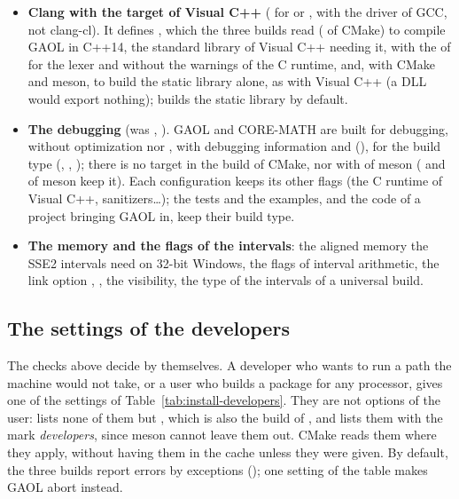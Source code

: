 \begin{itemize}
  target), which  takes by itself and the
  configuration says.
\item[$\bullet$] \textbf{Clang with the target of Visual C++}
  ( for  or
  , with the driver of GCC, not clang-cl). It
  defines , which the three builds read
  ( of CMake) to compile GAOL in C++14, the
  standard library of Visual C++ needing it, with the  of
   for the lexer and without the warnings of the C runtime,
  and, with CMake and meson, to build the static library alone, as with Visual
  C++ (a DLL would export nothing);  builds the static library
  by default.\newinvfive
\item[$\bullet$] \textbf{The debugging} (was ,
  ). GAOL and CORE-MATH are built for debugging,
  without optimization nor , with debugging information and
   (), for the
   build type (,
  , ); there is no target
   in the  build of CMake, nor with
   of meson ( and
   of meson keep it). Each configuration keeps its other flags (the C runtime
  of Visual C++, sanitizers\ldots); the tests and the examples, and the code
  of a project bringing GAOL in, keep their build type.
\item[$\bullet$] \textbf{The memory and the flags of the intervals}: the
  aligned memory the SSE2 intervals need on 32-bit Windows, the flags of
  interval arithmetic, the link option ,
  , the visibility, the type of the intervals of a universal
  build.
\end{itemize}

\subsection{The settings of the developers}\label{sec:install-developers}

The checks above decide by themselves. A developer who wants to run a path
the machine would not take, or a user who builds a package for any processor,
gives one of the settings of Table~\ref{tab:install-developers}. They are not
options of the user:  lists none of them but
, which is also the  build of , and
 lists them with the mark \emph{developers}, since meson
cannot leave them out. CMake reads them where they apply, without having them
in the cache unless they were given. By default, the three builds report errors by
exceptions (); one setting of the table makes GAOL abort instead.

